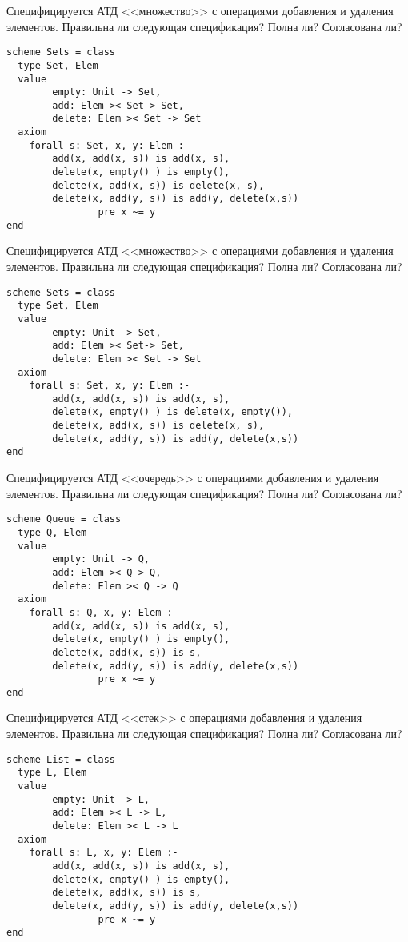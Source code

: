 \z Специфицируется АТД <<множество>> с операциями добавления и удаления элементов. Правильна ли следующая спецификация? Полна ли? Согласована ли?
\begin{lstlisting}
scheme Sets = class
  type Set, Elem
  value
        empty: Unit -> Set,
        add: Elem >< Set-> Set,
        delete: Elem >< Set -> Set
  axiom
    forall s: Set, x, y: Elem :-
        add(x, add(x, s)) is add(x, s),
        delete(x, empty() ) is empty(),
        delete(x, add(x, s)) is delete(x, s),
        delete(x, add(y, s)) is add(y, delete(x,s))
                pre x ~= y
end
\end{lstlisting}

\z Специфицируется АТД <<множество>> с операциями добавления и удаления элементов. Правильна ли следующая спецификация? Полна ли? Согласована ли?
\begin{lstlisting}
scheme Sets = class
  type Set, Elem
  value
        empty: Unit -> Set,
        add: Elem >< Set-> Set,
        delete: Elem >< Set -> Set
  axiom
    forall s: Set, x, y: Elem :-
        add(x, add(x, s)) is add(x, s),
        delete(x, empty() ) is delete(x, empty()),
        delete(x, add(x, s)) is delete(x, s),
        delete(x, add(y, s)) is add(y, delete(x,s))
end
\end{lstlisting}

\z Специфицируется АТД <<очередь>> с операциями добавления и удаления элементов. Правильна ли следующая спецификация? Полна ли? Согласована ли?
\begin{lstlisting}
scheme Queue = class
  type Q, Elem
  value
        empty: Unit -> Q,
        add: Elem >< Q-> Q,
        delete: Elem >< Q -> Q
  axiom
    forall s: Q, x, y: Elem :-
        add(x, add(x, s)) is add(x, s),
        delete(x, empty() ) is empty(),
        delete(x, add(x, s)) is s,
        delete(x, add(y, s)) is add(y, delete(x,s))
                pre x ~= y
end
\end{lstlisting}

\z Специфицируется АТД <<стек>> с операциями добавления и удаления элементов. Правильна ли следующая спецификация? Полна ли? Согласована ли?
\begin{lstlisting}
scheme List = class
  type L, Elem
  value
        empty: Unit -> L,
        add: Elem >< L -> L,
        delete: Elem >< L -> L
  axiom
    forall s: L, x, y: Elem :-
        add(x, add(x, s)) is add(x, s),
        delete(x, empty() ) is empty(),
        delete(x, add(x, s)) is s,
        delete(x, add(y, s)) is add(y, delete(x,s))
                pre x ~= y
end
\end{lstlisting}
